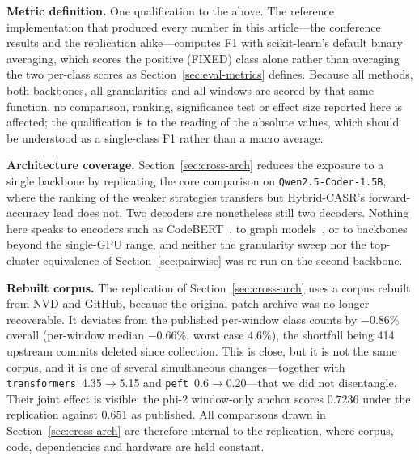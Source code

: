 
\textbf{Metric definition.} One qualification to the above. The reference implementation that produced every number in this article---the conference results and the replication alike---computes F1 with scikit-learn's default binary averaging, which scores the positive (FIXED) class alone rather than averaging the two per-class scores as Section~\ref{sec:eval-metrics} defines. Because all methods, both backbones, all granularities and all windows are scored by that same function, no comparison, ranking, significance test or effect size reported here is affected; the qualification is to the reading of the absolute values, which should be understood as a single-class F1 rather than a macro average.


\textbf{Architecture coverage.} Section~\ref{sec:cross-arch} reduces the exposure to a single backbone by replicating the core comparison on \texttt{Qwen2.5-Coder-1.5B}, where the ranking of the weaker strategies transfers but Hybrid-CASR's forward-accuracy lead does not. Two decoders are nonetheless still two decoders. Nothing here speaks to encoders such as CodeBERT~\citep{Feng2020CodeBERT}, to graph models~\citep{Zhou2019Devign,Cao2021BGNN4VD}, or to backbones beyond the single-GPU range, and neither the granularity sweep nor the top-cluster equivalence of Section~\ref{sec:pairwise} was re-run on the second backbone.

\textbf{Rebuilt corpus.} The replication of Section~\ref{sec:cross-arch} uses a corpus rebuilt from NVD and GitHub, because the original patch archive was no longer recoverable. It deviates from the published per-window class counts by $-0.86\%$ overall (per-window median $-0.66\%$, worst case $4.6\%$), the shortfall being 414 upstream commits deleted since collection. This is close, but it is not the same corpus, and it is one of several simultaneous changes---together with \texttt{transformers}~4.35$\rightarrow$5.15 and \texttt{peft}~0.6$\rightarrow$0.20---that we did not disentangle. Their joint effect is visible: the phi-2 window-only anchor scores $0.7236$ under the replication against $0.651$ as published. All comparisons drawn in Section~\ref{sec:cross-arch} are therefore internal to the replication, where corpus, code, dependencies and hardware are held constant.

